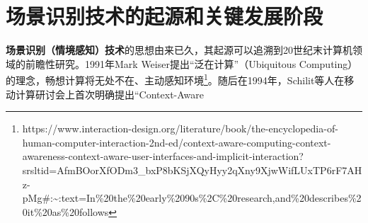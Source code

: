 \documentclass[
  letterpaper,
]{scrbook}
\begin{document}
\section{场景识别技术的起源和关键发展阶段}\label{ux573aux666fux8bc6ux522bux6280ux672fux7684ux8d77ux6e90ux548cux5173ux952eux53d1ux5c55ux9636ux6bb5}

\textbf{场景识别（情境感知）技术}的思想由来已久，其起源可以追溯到20世纪末计算机领域的前瞻性研究。1991年Mark
Weiser提出``泛在计算''（Ubiquitous
Computing）的理念，畅想计算将无处不在、主动感知环境\footnote{https://www.interaction-design.org/literature/book/the-encyclopedia-of-human-computer-interaction-2nd-ed/context-aware-computing-context-awareness-context-aware-user-interfaces-and-implicit-interaction?srsltid=AfmBOorXfODm3\_bxP8bKSjXQyHyy2qXny9XjwWifLUxTP6rF7AHz-pMg\#:\textasciitilde:text=In\%20the\%20early\%2090s\%2C\%20research,and\%20describes\%20it\%20as\%20follows}。随后在1994年，Schilit等人在移动计算研讨会上首次明确提出``Context-Aware
\end{document}

